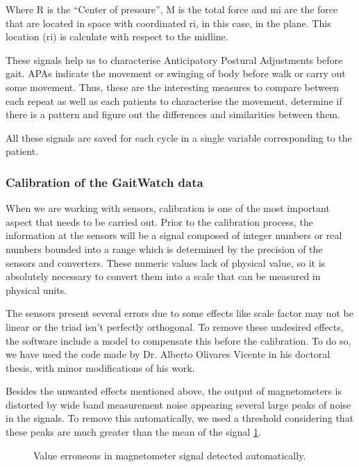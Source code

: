 Where R is the “Center of pressure”, M is the total force and mi are the force that are located in space with coordinated ri, in this case, in the plane. This location (ri) is calculate with respect to the midline.

These signals help us to characterise Anticipatory Postural Adjustments  before gait.  APAs indicate the movement or swinging of body before walk or carry out some movement. Thus, these are the interesting  measures to compare between each repeat as well as each patients to characterise the movement, determine if there is a pattern and figure out the differences and similarities between them.

All these signals are saved for each cycle in a single variable corresponding to the patient.


\subsubsection{Calibration of the GaitWatch data}
When we are working with sensors, calibration is one of the most important aspect that needs to be carried out. Prior to the calibration process,
the information at the sensors  will be a signal composed of integer
numbers  or real numbers bounded into a range which is determined by the precision of the sensors and converters. These numeric values lack of physical value, so it is absolutely necessary to convert them into a scale that can be measured in physical units.

The sensors present several errors due to some effects like scale factor may not be linear or the triad isn’t perfectly orthogonal. To remove these undesired effects, the software include a model to compensate this before the calibration. 
To do so, we have used the code made by Dr. Alberto Olivares Vicente in his doctoral thesis\cite{A.Olivares2013}, with minor modifications of his work.

Besides the unwanted effects mentioned above, the output of magnetometers is distorted by wide band measurement noise appearing several large peaks of noise in the signals. To remove this automatically, we used a threshold considering that these peaks are much greater than the mean of the signal \ref{fig:GWErrorDetected}.

\begin{figure}[H]
	\centering
	\caption{Value erroneous in magnetometer signal detected automatically.}
	\label{fig:GWErrorDetected}
	\end{figure}

